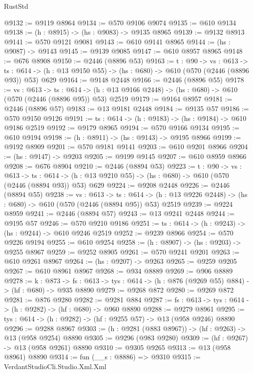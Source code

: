 \begin{lexlean}{RustStd}
\begin{coremodule}
@9132 := @9119 @8964
@9134 := @570 @9106 @9074
@9135 := @610 @9134
@9138 := (h : @8915) -> (hs : @9083) -> @9135 @8965
@9139 := @9132 @8913
@9141 := @570 @9121 @9081
@9143 := @610 @9141 @8965
@9144 := (hs : @9087) -> @9143
@9145 := @9139 @9085
@9147 := @610 @8957 @8965
@9148 := @676 @8908
@9150 := @2446 (@8896 @53)
@9163 := {t : @90} ->
  {vs : @613} ->
  {ts : @614} -> (h : @13 @9150 @55) -> (hs : @680) -> @610 (@570 (@2446 (@8896 @93)) @53) @629
@9164 := @9148 @2448
@9166 := @2446 (@8896 @55)
@9178 := {vs : @613} ->
  {ts : @614} -> (h : @13 @9166 @2448) -> (hs : @680) -> @610 (@570 (@2446 (@8896 @95)) @53) @2519
@9179 := @9164 @8957
@9181 := @2446 (@8896 @57)
@9183 := @13 @9181 @2448
@9184 := @9135 @57
@9186 := @570 @9150 @9126
@9191 := {ts : @614} -> (h : @9183) -> (hs : @9184) -> @610 @9186 @2519
@9192 := @9179 @8965
@9194 := @570 @9166 @9134
@9195 := @610 @9194
@9198 := (h : @8911) -> (hs : @9143) -> @9195 @8966
@9199 := @9192 @8909
@9201 := @570 @9181 @9141
@9203 := @610 @9201 @8966
@9204 := (hs : @9147) -> @9203
@9205 := @9199 @9145
@9207 := @610 @8959 @8966
@9208 := @676 @8904
@9210 := @2446 (@8894 @53)
@9223 := {t : @90} ->
  {vs : @613} ->
  {ts : @614} -> (h : @13 @9210 @55) -> (hs : @680) -> @610 (@570 (@2446 (@8894 @93)) @53) @629
@9224 := @9208 @2448
@9226 := @2446 (@8894 @55)
@9238 := {vs : @613} ->
  {ts : @614} -> (h : @13 @9226 @2448) -> (hs : @680) -> @610 (@570 (@2446 (@8894 @95)) @53) @2519
@9239 := @9224 @8959
@9241 := @2446 (@8894 @57)
@9243 := @13 @9241 @2448
@9244 := @9195 @57
@9246 := @570 @9210 @9186
@9251 := {ts : @614} -> (h : @9243) -> (hs : @9244) -> @610 @9246 @2519
@9252 := @9239 @8966
@9254 := @570 @9226 @9194
@9255 := @610 @9254
@9258 := (h : @8907) -> (hs : @9203) -> @9255 @8967
@9259 := @9252 @8905
@9261 := @570 @9241 @9201
@9263 := @610 @9261 @8967
@9264 := (hs : @9207) -> @9263
@9265 := @9259 @9205
@9267 := @610 @8961 @8967
@9268 := @934 @8889
@9269 := @906 @8889
@9278 := {k : @873} ->
  {fs : @613} -> {tys : @614} -> (h : @876 (@9269 @55) @884) -> (hf : @680) -> @935 @8890
@9279 := @9268 @872
@9280 := @9269 @872
@9281 := @876 @9280
@9282 := @9281 @884
@9287 := {fs : @613} -> {tys : @614} -> (h : @9282) -> (hf : @680) -> @960 @8890
@9288 := @9279 @8961
@9295 := {tys : @614} -> (h : @9282) -> (hf : @9255 @57) -> @13 (@958 @9246) @8890
@9296 := @9288 @8967
@9303 := (h : @9281 (@883 @8967)) -> (hf : @9263) -> @13 (@958 @9254) @8890
@9305 := @9296 (@983 @9280)
@9309 := (hf : @9267) -> @13 (@958 @9261) @8890
@9310 := @9305 @9265
@9313 := @13 (@958 @8961) @8890
@9314 := fun (__s : @8886) => @9310
@9315 := VerdantStudioCli.Studio.Xml.Xml

\end{coremodule}
\end{lexlean}
